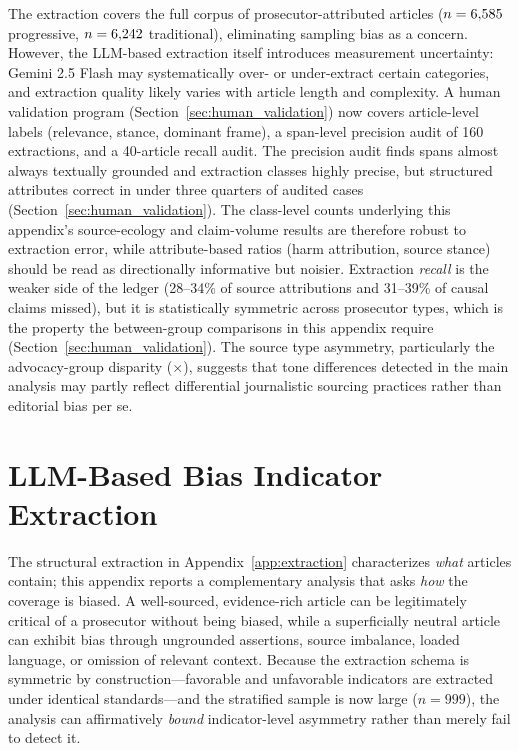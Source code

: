 \documentclass[12pt, letterpaper]{article}
\begin{document}
\begin{appendices}
The extraction covers the full corpus of prosecutor-attributed articles ($n=6{,}585$ progressive, $n=6{,}242$ traditional), eliminating sampling bias as a concern. However, the LLM-based extraction itself introduces measurement uncertainty: Gemini 2.5 Flash may systematically over- or under-extract certain categories, and extraction quality likely varies with article length and complexity. A human validation program (Section~\ref{sec:human_validation}) now covers article-level labels (relevance, stance, dominant frame), a span-level precision audit of 160 extractions, and a 40-article recall audit. The precision audit finds spans almost always textually grounded and extraction classes highly precise, but structured attributes correct in under three quarters of audited cases (Section~\ref{sec:human_validation}). The class-level counts underlying this appendix's source-ecology and claim-volume results are therefore robust to extraction error, while attribute-based ratios (harm attribution, source stance) should be read as directionally informative but noisier. Extraction \emph{recall} is the weaker side of the ledger (28--34\% of source attributions and 31--39\% of causal claims missed), but it is statistically symmetric across prosecutor types, which is the property the between-group comparisons in this appendix require (Section~\ref{sec:human_validation}). The source type asymmetry, particularly the advocacy-group disparity (\AdvocacyRatio$\times$), suggests that tone differences detected in the main analysis may partly reflect differential journalistic sourcing practices rather than editorial bias per se.


\section{LLM-Based Bias Indicator Extraction}
\label{app:bias}

The structural extraction in Appendix~\ref{app:extraction} characterizes \emph{what} articles contain; this appendix reports a complementary analysis that asks \emph{how} the coverage is biased. A well-sourced, evidence-rich article can be legitimately critical of a prosecutor without being biased, while a superficially neutral article can exhibit bias through ungrounded assertions, source imbalance, loaded language, or omission of relevant context. Because the extraction schema is symmetric by construction---favorable and unfavorable indicators are extracted under identical standards---and the stratified sample is now large ($n = 999$), the analysis can affirmatively \emph{bound} indicator-level asymmetry rather than merely fail to detect it.


\end{appendices}
\end{document}
